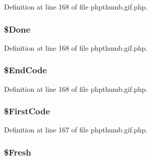 \-Definition at line 168 of file phpthumb.\-gif.\-php.

\hypertarget{class_c_g_i_f_l_z_w_ac34b357749c164306da31f8d8cf04864}{
\subsubsection[{\$\-Done}]{\setlength{\rightskip}{0pt plus 5cm}\$\-Done}}\label{class_c_g_i_f_l_z_w_ac34b357749c164306da31f8d8cf04864}


\-Definition at line 168 of file phpthumb.\-gif.\-php.

\hypertarget{class_c_g_i_f_l_z_w_af4668432a1df8ba9875cee1f4b32359d}{
\subsubsection[{\$\-End\-Code}]{\setlength{\rightskip}{0pt plus 5cm}\$\-End\-Code}}\label{class_c_g_i_f_l_z_w_af4668432a1df8ba9875cee1f4b32359d}


\-Definition at line 168 of file phpthumb.\-gif.\-php.

\hypertarget{class_c_g_i_f_l_z_w_a41cf783b0e7dcbb54e0fbcbf162817db}{
\subsubsection[{\$\-First\-Code}]{\setlength{\rightskip}{0pt plus 5cm}\$\-First\-Code}}\label{class_c_g_i_f_l_z_w_a41cf783b0e7dcbb54e0fbcbf162817db}


\-Definition at line 167 of file phpthumb.\-gif.\-php.

\hypertarget{class_c_g_i_f_l_z_w_a620c521e6daef6a87b72e2816ba809fa}{
\subsubsection[{\$\-Fresh}]{\setlength{\rightskip}{0pt plus 5cm}\$\-Fresh}}\label{class_c_g_i_f_l_z_w_a620c521e6daef6a87b72e2816ba809fa}


